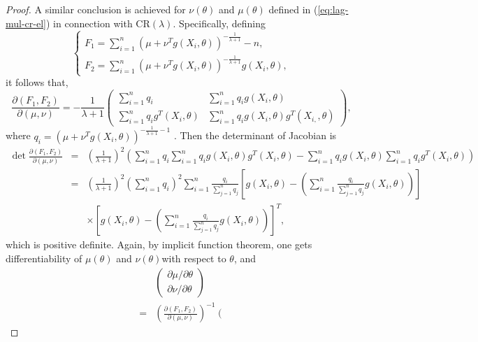 \documentclass[oneside,english]{amsbook}
\numberwithin{section}{chapter}
\numberwithin{equation}{section}
\numberwithin{figure}{section}
\theoremstyle{plain}
\theoremstyle{plain}
\theoremstyle{definition}
\theoremstyle{plain}
\theoremstyle{plain}
\theoremstyle{remark}
\theoremstyle{definition}
\theoremstyle{definition}
\begin{document}
\begin{proof}
A similar conclusion is achieved for $\nu\left(\theta\right)$ and
$\mu\left(\theta\right)$ defined in (\ref{eq:lag-mul-cr-el}) in
connection with CR$\left(\lambda\right)$. Specifically, defining
\[
\begin{cases}
F_{1}=\sum_{i=1}^{n}\left(\mu+\nu^{T}g\left(X_{i},\theta\right)\right)^{-\frac{1}{\lambda+1}}-n,\\
F_{2}=\sum_{i=1}^{n}\left(\mu+\nu^{T}g\left(X_{i},\theta\right)\right)^{-\frac{1}{\lambda+1}}g\left(X_{i},\theta\right),
\end{cases}
\]
it follows that,
\[
\frac{\partial\left(F_{1},F_{2}\right)}{\partial\left(\mu,\nu\right)}=-\frac{1}{\lambda+1}\left(\begin{array}{cc}
\sum_{i=1}^{n}q_{i} & \sum_{i=1}^{n}q_{i}g\left(X_{i},\theta\right)\\
\sum_{i=1}^{n}q_{i}g^{T}\left(X_{i},\theta\right) & \sum_{i=1}^{n}q_{i}g\left(X_{i},\theta\right)g^{T}\left(X_{i,},\theta\right)
\end{array}\right),
\]
 where $q_{i}=\left(\mu+\nu^{T}g\left(X_{i},\theta\right)\right)^{-\frac{1}{\lambda+1}-1}$
. Then the determinant of Jacobian is 
\begin{eqnarray*}
\det\frac{\partial\left(F_{1},F_{2}\right)}{\partial\left(\mu,\nu\right)} & = & \left(\frac{1}{\lambda+1}\right)^{2}\left(\sum_{i=1}^{n}q_{i}\sum_{i=1}^{n}q_{i}g\left(X_{i},\theta\right)g^{T}\left(X_{i},\theta\right)-\sum_{i=1}^{n}q_{i}g\left(X_{i},\theta\right)\sum_{i=1}^{n}q_{i}g^{T}\left(X_{i},\theta\right)\right)\\
 & = & \left(\frac{1}{\lambda+1}\right)^{2}\left(\sum_{i=1}^{n}q_{i}\right)^{2}\sum_{i=1}^{n}\frac{q_{i}}{\sum_{j=1}^{n}q_{j}}\left[g\left(X_{i},\theta\right)-\left(\sum_{i=1}^{n}\frac{q_{i}}{\sum_{j=1}^{n}q_{j}}g\left(X_{i},\theta\right)\right)\right]\\
 &  & \times\left[g\left(X_{i},\theta\right)-\left(\sum_{i=1}^{n}\frac{q_{i}}{\sum_{j=1}^{n}q_{j}}g\left(X_{i},\theta\right)\right)\right]^{T},
\end{eqnarray*}
which is positive definite. Again, by implicit function theorem, one
gets differentiability of $\mu\left(\theta\right)$ and $\nu\left(\theta\right)$with
respect to $\theta$, and 
\begin{eqnarray}
 &  & \left(\begin{array}{c}
\partial\mu/\partial\theta\\
\partial\nu/\partial\theta
\end{array}\right)\nonumber \\
 & = & \left(\frac{\partial\left(F_{1},F_{2}\right)}{\partial\left(\mu,\nu\right)}\right)^{-1}\left(\begin{array}{c}

\end{array}
\end{eqnarray}
\end{proof}
\end{document}
